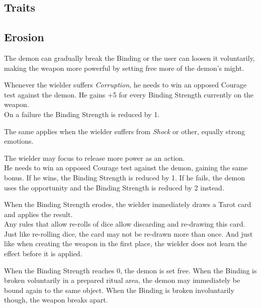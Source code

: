 \subsection{Traits}
\label{sec:traits}

\subsection{Erosion}
The demon can gradually break the Binding
	or the user can loosen it voluntarily,
	making the weapon more powerful by setting free more of the demon's might.
\\%
\begin{sitemize}
	\item Whenever the wielder suffers \emph{Corruption},
		he needs to win an opposed Courage test against the demon.
		He gains +5 for every Binding Strength currently on the weapon.
		\\%
		On a failure the Binding Strength is reduced by 1.
	\item The same applies when the wielder suffers from \emph{Shock}
		or other, equally strong emotions.
	\item The wielder may focus to release more power as an action.
		\\%
		He needs to win an opposed Courage test against the demon,
		gaining the same bonus.
		If he wins, the Binding Strength is reduced by 1.
		If he fails, the demon uses the opportunity
		and the Binding Strength is reduced by 2 instead.
\end{sitemize}
\par%
\needspace{20mm}
When the Binding Strength erodes,
	the wielder immediately draws a Tarot card
	and applies the result.
\\%
Any rules that allow re-rolls of dice
	allow discarding and re-drawing this card.
Just like re-rolling dice, the card may not be re-drawn more than once.
And just like when creating the weapon in the first place,
	the wielder does not learn the effect before it is applied.
\par%
When the Binding Strength reaches 0, the demon is set free.
When the Binding is broken voluntarily in a prepared ritual area,
	the demon may immediately be bound again to the same object.
When the Binding is broken involuntarily though,
	the weapon breaks apart.
